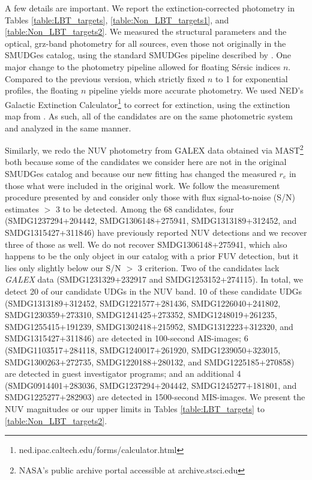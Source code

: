 \documentclass[twocolumn,tighten]{aastex63}
\begin{document}
A few details are important. 
We report the extinction-corrected photometry in Tables \ref{table:LBT_targets}, \ref{table:Non_LBT_targets1}, and \ref{table:Non_LBT_targets2}. We measured the structural parameters and the optical, grz-band photometry for all sources, even those not originally in the SMUDGes catalog, using the standard SMUDGes pipeline described by \cite{Zaritsky19}. One major change to the photometry pipeline allowed for floating S\'ersic indices $n$. Compared to the previous version, which strictly fixed $n$ to 1 for exponential profiles, the floating $n$ pipeline yields more accurate photometry.
We used NED's Galactic Extinction Calculator\footnote{ned.ipac.caltech.edu/forms/calculator.html} to correct for extinction, using the extinction map from \cite{Schafly2011}. As such, all of the candidates are on the same photometric system and analyzed in the same manner.

Similarly, we redo the NUV photometry from GALEX \citep{martin2005} data obtained via MAST\footnote{NASA's public archive portal accessible at archive.stsci.edu} both because some of the candidates we consider here are not in the original SMUDGes catalog and because our new fitting has changed the measured $r_e$ in those what were included in the original work. We follow the measurement procedure presented by \cite{rs} and consider only those with flux signal-to-noise (S/N) estimates $>$ 3 to be detected.
Among the 68 candidates, four  (SMDG1237294+204442, SMDG1306148+275941, SMDG1313189+312452, and SMDG1315427+311846) have previously reported NUV detections \citep{rs} and we recover three of those as well. We do not recover SMDG1306148+275941, which also happens to be the only object in our catalog with a prior FUV detection, but it lies only slightly below our S/N $>$ 3 criterion. Two of the candidates lack {\sl GALEX} data (SMDG1231329+232917 and SMDG1253152+274115). 
In total, we detect 20 of our candidate UDGs in the NUV band. 10 of these candidate UDGs (SMDG1313189+312452, SMDG1221577+281436, SMDG1226040+241802, SMDG1230359+273310, SMDG1241425+273352, SMDG1248019+261235, SMDG1255415+191239, SMDG1302418+215952, SMDG1312223+312320, and SMDG1315427+311846) are detected in 100-second AIS-images; 6 (SMDG1103517+284118, SMDG1240017+261920, SMDG1239050+323015, SMDG1300263+272735, SMDG1220188+280132, and SMDG1225185+270858) are detected in guest investigator programs; and an additional 4 (SMDG0914401+283036, SMDG1237294+204442, SMDG1245277+181801, and SMDG1225277+282903) are detected in 1500-second MIS-images. We present the NUV magnitudes or our upper limits in Tables \ref{table:LBT_targets} to \ref{table:Non_LBT_targets2}.
\end{document}

